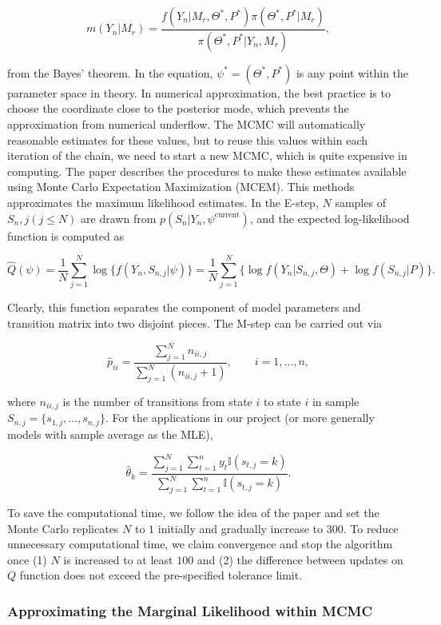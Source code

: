 \documentclass{article}
\begin{document}
\[m(Y_n|M_r)=\frac{f(Y_n|M_r,\Theta^{*},P^{*})\pi(\Theta^{*},P^{*}|M_r)}{\pi(\Theta^{*},P^{*}|Y_n,M_r)},\]

from the Bayes' theorem. In the equation, $\psi^{*}=(\Theta^{*},P^{*})$
is any point within the parameter space in theory. In numerical
approximation, the best practice is to choose the coordinate close to
the posterior mode, which prevents the approximation from numerical
underflow. The MCMC will automatically reasonable estimates for these
values, but to reuse this values within each iteration of the chain, we
need to start a new MCMC, which is quite expensive in computing. The
paper describes the procedures to make these estimates available using
Monte Carlo Expectation Maximization (MCEM). This methods approximates
the maximum likelihood estimates. In the E-step, $N$ samples of
$S_n,j(j\leq N)$ are drawn from $p(S_n|Y_n,\psi^{\text{current}})$, and
the expected log-likelihood function is computed as

\[\hat{Q}(\psi)=\frac{1}{N}\sum_{j=1}^N \log\{f(Y_n,S_{n,j}|\psi)\}=\frac{1}{N}\sum_{j=1}^N \{\log f(Y_n|S_{n,j},\Theta)+\log f(S_{n,j}|P) \}.\]

Clearly, this function separates the component of model parameters and
transition matrix into two disjoint pieces. The M-step can be carried
out via

\[\hat{p}_{ii}=\frac{\sum_{j=1}^N n_{ii,j}}{\sum_{j=1}^N(n_{ii,j}+1)},\qquad i=1,\ldots,n,\]

where $n_{ii,j}$ is the number of transitions from state $i$ to state
$i$ in sample $S_{n,j}=\{s_{1,j},\ldots,s_{n,j}\}$. For the applications
in our project (or more generally models with sample average as the
MLE),

\[\hat{\theta}_k=\frac{\sum_{j=1}^N\sum_{t=1}^n y_t\mathbb{I}(s_{t,j}=k)}{\sum_{j=1}^N\sum_{t=1}^n \mathbb{I}(s_{t,j}=k)}.\]

To save the computational time, we follow the idea of the paper and set
the Monte Carlo replicates $N$ to $1$ initially and gradually increase
to $300$. To reduce unnecessary computational time, we claim convergence
and stop the algorithm once (1) $N$ is increased to at least $100$ and
(2) the difference between updates on $Q$ function does not exceed the
pre-specified tolerance limit.

\subsubsection{Approximating the Marginal Likelihood within
MCMC}\label{approximating-the-marginal-likelihood-within-mcmc}
\end{document}
